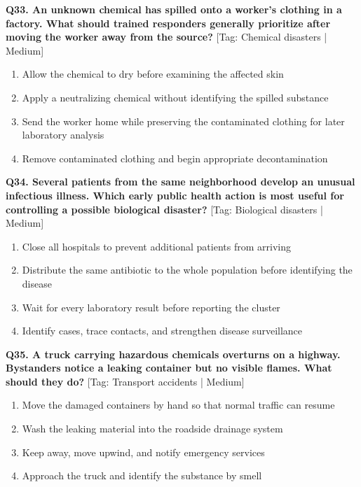\noindent\textbf{Q33. An unknown chemical has spilled onto a worker's clothing in a factory. What should trained responders generally prioritize after moving the worker away from the source?} \hfill [Tag: Chemical disasters | Medium]
\begin{enumerate}[label=(\alph*),topsep=2pt,itemsep=1pt,partopsep=0pt,parsep=0pt]
    \item {Allow the chemical to dry before examining the affected skin}
    \item {Apply a neutralizing chemical without identifying the spilled substance}
    \item {Send the worker home while preserving the contaminated clothing for later laboratory analysis}
    \item {Remove contaminated clothing and begin appropriate decontamination}
\end{enumerate}
\vspace{2mm}

\noindent\textbf{Q34. Several patients from the same neighborhood develop an unusual infectious illness. Which early public health action is most useful for controlling a possible biological disaster?} \hfill [Tag: Biological disasters | Medium]
\begin{enumerate}[label=(\alph*),topsep=2pt,itemsep=1pt,partopsep=0pt,parsep=0pt]
    \item {Close all hospitals to prevent additional patients from arriving}
    \item {Distribute the same antibiotic to the whole population before identifying the disease}
    \item {Wait for every laboratory result before reporting the cluster}
    \item {Identify cases, trace contacts, and strengthen disease surveillance}
\end{enumerate}
\vspace{2mm}

\noindent\textbf{Q35. A truck carrying hazardous chemicals overturns on a highway. Bystanders notice a leaking container but no visible flames. What should they do?} \hfill [Tag: Transport accidents | Medium]
\begin{enumerate}[label=(\alph*),topsep=2pt,itemsep=1pt,partopsep=0pt,parsep=0pt]
    \item {Move the damaged containers by hand so that normal traffic can resume}
    \item {Wash the leaking material into the roadside drainage system}
    \item {Keep away, move upwind, and notify emergency services}
    \item {Approach the truck and identify the substance by smell}
\end{enumerate}
\vspace{2mm}

